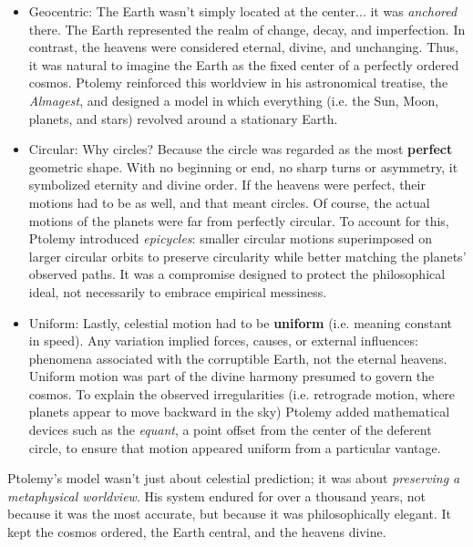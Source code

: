 \begin{itemize}

    \item Geocentric: The Earth wasn’t simply located at the center... it was \emph{anchored} there. The Earth represented the realm of change, decay, and imperfection. In contrast, the heavens were considered eternal, divine, and unchanging. Thus, it was natural to imagine the Earth as the fixed center of a perfectly ordered cosmos. Ptolemy reinforced this worldview in his astronomical treatise, the \emph{Almagest}, and designed a model in which everything (i.e. the Sun, Moon, planets, and stars) revolved around a stationary Earth.

    \item Circular: Why circles? Because the circle was regarded as the most \textbf{perfect} geometric shape. With no beginning or end, no sharp turns or asymmetry, it symbolized eternity and divine order. If the heavens were perfect, their motions had to be as well, and that meant circles.  Of course, the actual motions of the planets were far from perfectly circular. To account for this, Ptolemy introduced \emph{epicycles}: smaller circular motions superimposed on larger circular orbits to preserve circularity while better matching the planets' observed paths. It was a compromise designed to protect the philosophical ideal, not necessarily to embrace empirical messiness.

    \item Uniform: Lastly, celestial motion had to be \textbf{uniform} (i.e. meaning constant in speed). Any variation implied forces, causes, or external influences: phenomena associated with the corruptible Earth, not the eternal heavens. Uniform motion was part of the divine harmony presumed to govern the cosmos.  To explain the observed irregularities (i.e. retrograde motion, where planets appear to move backward in the sky) Ptolemy added mathematical devices such as the \emph{equant}, a point offset from the center of the deferent circle, to ensure that motion appeared uniform from a particular vantage.

\end{itemize}

Ptolemy’s model wasn’t just about celestial prediction; it was about \emph{preserving a metaphysical worldview}. His system endured for over a thousand years, not because it was the most accurate, but because it was philosophically elegant. It kept the cosmos ordered, the Earth central, and the heavens divine.

